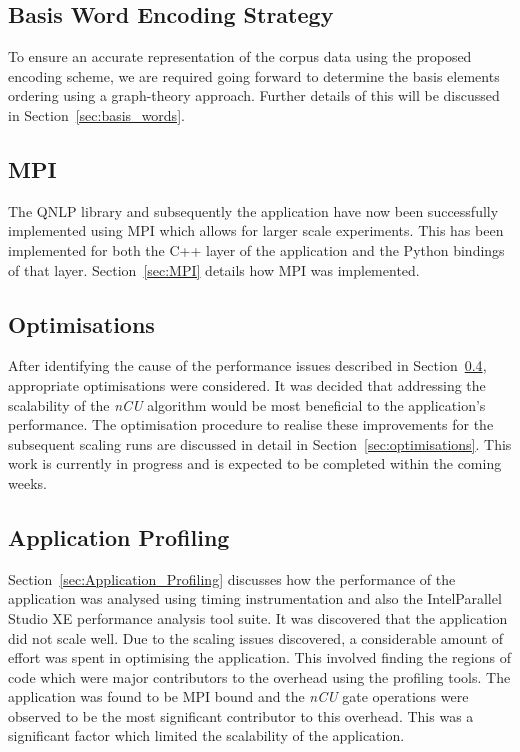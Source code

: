 \subsection{Basis Word Encoding Strategy}
To ensure an accurate representation of the corpus data using the proposed encoding scheme, we are required going forward to determine the basis elements ordering using a graph-theory approach. Further details of this will be discussed in Section~\ref{sec:basis_words}.

\subsection{MPI}
\label{sec:intro_MPI}
The QNLP library and subsequently the application have now been successfully implemented using MPI which allows for larger scale experiments. This has been implemented for both the C++ layer of the application and the Python bindings of that layer. Section~\ref{sec:MPI} details how MPI was implemented.

\subsection{Optimisations}
\label{sec:intro_optimisations}
After identifying the cause of the performance issues described in Section~\ref{sec:intro_application_profiling}, appropriate optimisations were considered. It was decided that addressing the scalability of the \textit{nCU} algorithm would be most beneficial to the application's performance. The optimisation procedure to realise these improvements for the subsequent scaling runs are discussed in detail in Section~\ref{sec:optimisations}. This work is currently in progress and is expected to be completed within the coming weeks.

\subsection{Application Profiling}
\label{sec:intro_application_profiling}
Section~\ref{sec:Application_Profiling} discusses how the performance of the application was analysed using timing instrumentation and also the Intel\textregistered Parallel Studio XE performance analysis tool suite. It was discovered that the application did not scale well. Due to the scaling issues discovered, a considerable amount of effort was spent in optimising the application. This involved finding the regions of code which were major contributors to the overhead using the profiling tools. The application was found to be MPI bound and the \textit{nCU} gate operations were observed to be the most significant contributor to this overhead. This was a significant factor which limited the scalability of the application. 

